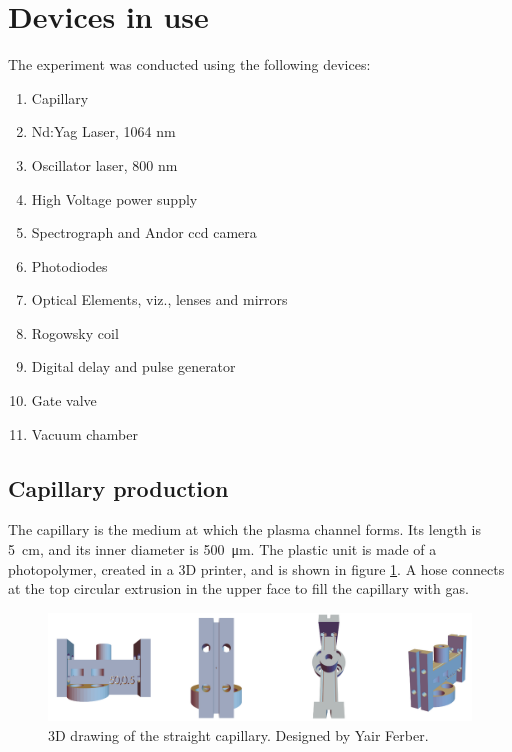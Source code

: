 \documentclass[../main.tex]{subfiles}
\begin{document}
	\section{Devices in use}\label{sec:devices}
The experiment was conducted using the following devices:
\begin{enumerate}
    \item Capillary
    \item Nd:Yag Laser, 1064 nm
    \item Oscillator laser, 800 nm
    \item High Voltage power supply
    \item Spectrograph and Andor ccd camera
    \item Photodiodes
    \item Optical Elements, viz., lenses and mirrors
    \item Rogowsky coil
    \item Digital delay and pulse generator
    \item Gate valve
    \item Vacuum chamber
\end{enumerate}
\subsection{Capillary production}
The capillary is the medium at which the plasma channel forms. Its length is \SI{5}{\cm}, and its inner diameter is \SI{500}{\um}. The plastic unit is made of a photopolymer, created in a 3D printer, and is shown in figure \ref{fig:onecapillaryCAD}. A hose connects at the top circular extrusion in the upper face to fill the capillary with gas.
\begin{figure}[b]
    \centering
    \includegraphics[width=\textwidth]{figures/onecapillary_cad.png}
    \caption{3D drawing of the straight capillary.  Designed by Yair Ferber.}
    \label{fig:onecapillaryCAD}
\end{figure}
\end{document}
